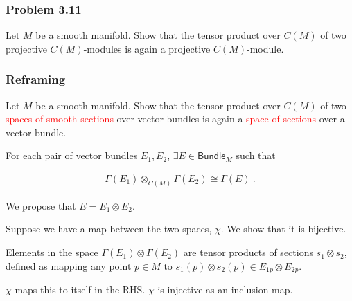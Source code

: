 \begin{frame}
    \frametitle{Problem 3.11}

    Let \(M\) be a smooth manifold. Show that the tensor product over \(C(M)\)
    of two projective \(C(M)\)-modules is again a projective \(C(M)\)-module.


\end{frame}

\begin{frame}
    \frametitle{Reframing}

    Let \(M\) be a smooth manifold. Show that the tensor product over \(C(M)\)
    of two \textcolor{red}{spaces of smooth sections} over vector bundles is
    again a \textcolor{red}{space of sections} over a vector bundle. \\ \pause

    For each pair of vector bundles \(E_1, E_2\), \(\exists E \in
    \textsf{Bundle}_M\) such that 
    
    \begin{gather*}        
        \Gamma(E_1) \otimes_{C(M)} \Gamma(E_2) \cong \Gamma(E)~.
    \end{gather*}



\end{frame}

\begin{frame}

    We propose that \(E = E_1\otimes E_2\). \pause

    Suppose we have a map between the two spaces, \(\chi\). We show that it is
    bijective. \pause

    Elements in the space \(\Gamma(E_1) \otimes \Gamma(E_2)\) are tensor
    products of sections \(s_1 \otimes s_2\), defined as mapping any point \(p
    \in M\) to \(s_1(p)\otimes s_2(p) \in E_{1p} \otimes E_{2p}\). \\ \pause

    \(\chi\) maps this to itself in the RHS. \(\chi\) is injective as an
    inclusion map.


\end{frame}

